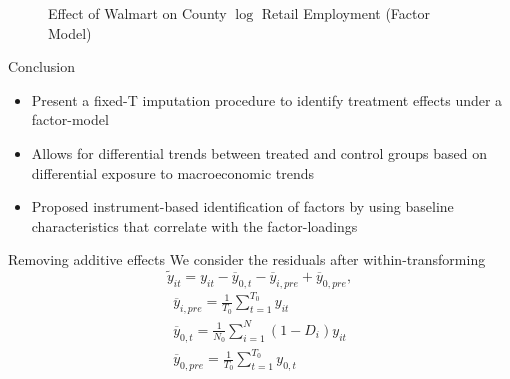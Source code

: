 \documentclass[aspectratio=43,t]{beamer}
\begin{document}
\begin{frame}{}
  \begin{figure}
    \caption{Effect of Walmart on County $\log$ Retail Employment (Factor Model)}
  \end{figure}
\end{frame}

\begin{frame}{Conclusion}
  \begin{itemize}
    \item Present a fixed-T imputation procedure to identify treatment effects under a factor-model 
    
    \item Allows for differential trends between treated and control groups based on differential exposure to macroeconomic trends
    
    \item Proposed instrument-based identification of factors by using baseline characteristics that correlate with the factor-loadings
  \end{itemize}
\end{frame}

\appendix
\begin{frame}{Removing additive effects}
  We consider the residuals after within-transforming
  $$
    \tilde{y}_{it} = y_{it} - \overline{y}_{0,t} - \overline{y}_{i,pre} + \overline{y}_{0,pre},
  $$
  \begin{gather*}
    \overline{y}_{i, pre} = \frac{1}{T_0} \sum_{t = 1}^{T_0} y_{it} \\
    \overline{y}_{0, t} = \frac{1}{N_{0}} \sum_{i = 1}^N (1 - D_i) y_{it} \\
    \overline{y}_{0, pre} = \frac{1}{T_0} \sum_{t = 1}^{T_0} y_{0, t}
  \end{gather*}

\end{frame}
\end{document}
